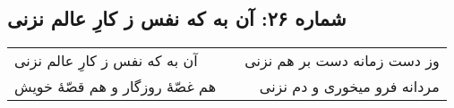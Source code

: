 \begin{center}
\section*{شماره ۲۶: آن به که نفس ز کارِ عالم نزنی}
\label{sec:026}
\begin{longtable}{l p{0.5cm} r}
آن به که نفس ز کارِ عالم نزنی
&&
وز دست زمانه دست بر هم نزنی
\\
هم غصّهٔ روزگار و هم قصّهٔ خویش
&&
مردانه فرو میخوری و دم نزنی
\\
\end{longtable}
\end{center}
